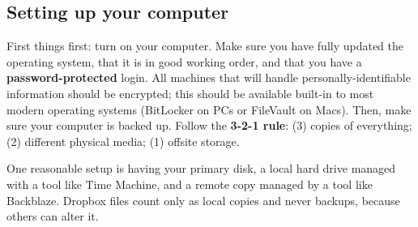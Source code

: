 \subsection{Setting up your computer}

First things first: turn on your computer.
Make sure you have fully updated the operating system,
that it is in good working order,
and that you have a \textbf{password-protected} login.
All machines that will handle personally-identifiable information should be encrypted;
this should be available built-in to most modern operating systems (BitLocker on PCs or FileVault on Macs).
Then, make sure your computer is backed up.
Follow the \textbf{3-2-1 rule}:
(3) copies of everything;
(2) different physical media;
(1) offsite storage.

One reasonable setup is having your primary disk,
a local hard drive managed with a tool like Time Machine,
and a remote copy managed by a tool like Backblaze.
Dropbox files count only as local copies and never backups,
because others can alter it.



